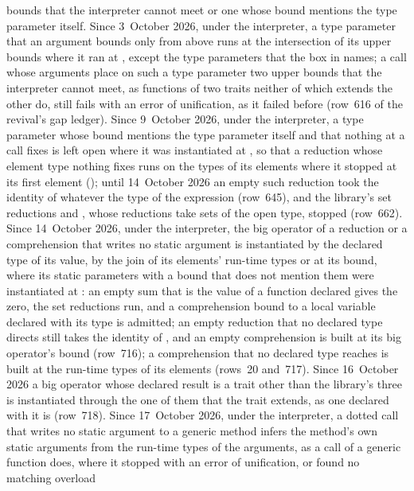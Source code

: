 \begin{description}
bounds that the interpreter cannot meet or one whose bound mentions the type
parameter itself.
Since 3~October 2026, under the interpreter, a type parameter that an argument
bounds only from above runs at the intersection of its upper bounds where it ran at
, except the type parameters that the box in
 names; a call whose arguments place on such a
type parameter two upper bounds that the interpreter cannot meet, as functions
of two traits neither of which extends the other do, still fails with an error
of unification, as it failed before (row~616 of the revival's gap ledger).
Since 9~October 2026, under the interpreter, a type parameter whose bound
mentions the type parameter itself and that nothing at a call fixes is left
open where it was instantiated at , so that a reduction whose
element type nothing fixes runs on the types of its elements where it stopped
at its first element (); until 14~October 2026 an
empty such reduction took the identity of  whatever the
type of the expression (row~645), and the library's set reductions
\EXP{\bigcup} and \EXP{\bigcap}, whose reductions take sets of the open
type, stopped (row~662).
Since 14~October 2026, under the interpreter, the big operator of a reduction
or a comprehension that writes no static argument is instantiated by the
declared type of its value, by the join of its elements' run-time types or at
its bound, where its static parameters with a bound that does not mention them
were instantiated at : an empty sum that is the value of a
function declared  gives the  zero, the
set reductions run, and a comprehension bound to a local variable declared
with its type is admitted; an empty reduction that no declared type directs
still takes the identity of , and an empty comprehension is
built at its big operator's bound (row~716); a comprehension that no
declared type reaches is built at the run-time types of its elements (rows~20
and~717). Since 16~October 2026 a big operator whose declared result is a
trait other than the library's three is instantiated through the one of them
that the trait extends, as one declared with it is (row~718).
Since 17~October 2026, under the interpreter, a dotted call that writes no
static argument to a generic method infers the method's own static arguments
from the run-time types of the arguments, as a call of a generic function does,
where it stopped with an error of unification, or found no matching overload

\end{description}
